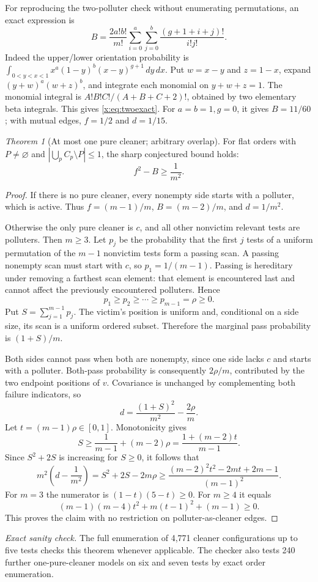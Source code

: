 \documentclass[11pt,a4paper]{article}
\theoremstyle{definition}\newtheorem{definition}[theorem]{Definition}
\theoremstyle{remark}\newtheorem{remark}[theorem]{Remark}
\newtheorem{xtheorem}{Theorem}\renewcommand{\thextheorem}{A.\arabic{xtheorem}}
\theoremstyle{definition}\newtheorem{xexample}[xtheorem]{Example}\theoremstyle{plain}
\newcommand{\xcheck}[1]{\par\smallskip\textit{Exact sanity check.} #1\par}
\begin{document}
For reproducing the two-polluter check without enumerating permutations, an exact expression is
\begin{equation}\label{x:eq:twoexact}
B=\frac{2a!b!}{m!}\sum_{i=0}^a\sum_{j=0}^b
\frac{(g+1+i+j)!}{i!j!}.
\end{equation}
Indeed the upper/lower orientation probability is
$\int_{0<y<x<1}x^a(1-y)^b(x-y)^{g+1}\,dy\,dx$.
Put $w=x-y$ and $z=1-x$, expand $(y+w)^a(w+z)^b$, and integrate each monomial on $y+w+z=1$. The monomial integral is $A!B!C!/(A+B+C+2)!$, obtained by two elementary beta integrals. This gives \eqref{x:eq:twoexact}. For $a=b=1,g=0$, it gives $B=11/60$; with mutual edges, $f=1/2$ and $d=1/15$.

\begin{xtheorem}[At most one pure cleaner; arbitrary overlap]\label{x:thm:onecleaner}
For flat orders with $P\ne\varnothing$ and
$|\bigcup_p C_p\setminus P|\le1$, the sharp conjectured bound holds:
\[
f^2-B\ge\frac1{m^2}.
\]
\end{xtheorem}
\begin{proof}
If there is no pure cleaner, every nonempty side starts with a polluter, which is active. Thus $f=(m-1)/m$, $B=(m-2)/m$, and $d=1/m^2$.

Otherwise the only pure cleaner is $c$, and all other nonvictim relevant tests are polluters. Then $m\ge3$. Let $p_j$ be the probability that the first $j$ tests of a uniform permutation of the $m-1$ nonvictim tests form a passing scan. A passing nonempty scan must start with $c$, so $p_1=1/(m-1)$. Passing is hereditary under removing a farthest scan element: that element is encountered last and cannot affect the previously encountered polluters. Hence
\[
p_1\ge p_2\ge\cdots\ge p_{m-1}=\rho\ge0.
\]
Put $S=\sum_{j=1}^{m-1}p_j$. The victim's position is uniform and, conditional on a side size, its scan is a uniform ordered subset. Therefore the marginal pass probability is $(1+S)/m$.

Both sides cannot pass when both are nonempty, since one side lacks $c$ and starts with a polluter. Both-pass probability is consequently $2\rho/m$, contributed by the two endpoint positions of $v$. Covariance is unchanged by complementing both failure indicators, so
\[
d=\frac{(1+S)^2}{m^2}-\frac{2\rho}{m}.
\]
Let $t=(m-1)\rho\in[0,1]$. Monotonicity gives
\[
S\ge\frac1{m-1}+(m-2)\rho=\frac{1+(m-2)t}{m-1}.
\]
Since $S^2+2S$ is increasing for $S\ge0$, it follows that
\[
m^2\left(d-\frac1{m^2}\right)
=S^2+2S-2m\rho
\ge\frac{(m-2)^2t^2-2mt+2m-1}{(m-1)^2}.
\]
For $m=3$ the numerator is $(1-t)(5-t)\ge0$. For $m\ge4$ it equals
\[
(m-1)(m-4)t^2+m(t-1)^2+(m-1)\ge0.
\]
This proves the claim with no restriction on polluter-as-cleaner edges.
\end{proof}
\xcheck{The full enumeration of 4,771 cleaner configurations up to five tests checks this theorem whenever applicable. The checker also tests 240 further one-pure-cleaner models on six and seven tests by exact order enumeration.}
\end{document}
